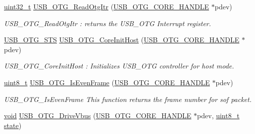 \begin{DoxyCompactItemize}
\hyperlink{stdint_8h_a435d1572bf3f880d55459d9805097f62}{uint32\-\_\-t} \hyperlink{group___u_s_b___c_o_r_e___private___functions_gafc87639da2066ccd7a2ad2eb8cbf7824}{U\-S\-B\-\_\-\-O\-T\-G\-\_\-\-Read\-Otg\-Itr} (\hyperlink{group___u_s_b___c_o_r_e___exported___types_gaf76054c11eb8a3367907aad7ae700e80}{U\-S\-B\-\_\-\-O\-T\-G\-\_\-\-C\-O\-R\-E\-\_\-\-H\-A\-N\-D\-L\-E} $\ast$pdev)
\begin{DoxyCompactList}\small\item\em U\-S\-B\-\_\-\-O\-T\-G\-\_\-\-Read\-Otg\-Itr \-: returns the U\-S\-B\-\_\-\-O\-T\-G Interrupt register. \end{DoxyCompactList}\item 
\hyperlink{group___u_s_b___c_o_r_e___exported___types_ga8b6504b9af0662f17515795db0f9c8ed}{U\-S\-B\-\_\-\-O\-T\-G\-\_\-\-S\-T\-S} \hyperlink{group___u_s_b___c_o_r_e___private___functions_gae1c6dd456378e903e16375594d2df7c7}{U\-S\-B\-\_\-\-O\-T\-G\-\_\-\-Core\-Init\-Host} (\hyperlink{group___u_s_b___c_o_r_e___exported___types_gaf76054c11eb8a3367907aad7ae700e80}{U\-S\-B\-\_\-\-O\-T\-G\-\_\-\-C\-O\-R\-E\-\_\-\-H\-A\-N\-D\-L\-E} $\ast$pdev)
\begin{DoxyCompactList}\small\item\em U\-S\-B\-\_\-\-O\-T\-G\-\_\-\-Core\-Init\-Host \-: Initializes U\-S\-B\-\_\-\-O\-T\-G controller for host mode. \end{DoxyCompactList}\item 
\hyperlink{stdint_8h_aba7bc1797add20fe3efdf37ced1182c5}{uint8\-\_\-t} \hyperlink{group___u_s_b___c_o_r_e___private___functions_gabb3be10118679d281845d0481ce39958}{U\-S\-B\-\_\-\-O\-T\-G\-\_\-\-Is\-Even\-Frame} (\hyperlink{group___u_s_b___c_o_r_e___exported___types_gaf76054c11eb8a3367907aad7ae700e80}{U\-S\-B\-\_\-\-O\-T\-G\-\_\-\-C\-O\-R\-E\-\_\-\-H\-A\-N\-D\-L\-E} $\ast$pdev)
\begin{DoxyCompactList}\small\item\em U\-S\-B\-\_\-\-O\-T\-G\-\_\-\-Is\-Even\-Frame This function returns the frame number for sof packet. \end{DoxyCompactList}\item 
\hyperlink{group___n_a_m_e_ga18028b8badbf1ea7e704ccac3c488e82}{void} \hyperlink{group___u_s_b___c_o_r_e___private___functions_gab72e542f660e9986ccd142913f4474b4}{U\-S\-B\-\_\-\-O\-T\-G\-\_\-\-Drive\-Vbus} (\hyperlink{group___u_s_b___c_o_r_e___exported___types_gaf76054c11eb8a3367907aad7ae700e80}{U\-S\-B\-\_\-\-O\-T\-G\-\_\-\-C\-O\-R\-E\-\_\-\-H\-A\-N\-D\-L\-E} $\ast$pdev, \hyperlink{stdint_8h_aba7bc1797add20fe3efdf37ced1182c5}{uint8\-\_\-t} \hyperlink{posix_2posix_2pios__flashfs__logfs_8c_a13a6109e91ad12705df96a0f2743c630}{state})

\end{DoxyCompactItemize}
